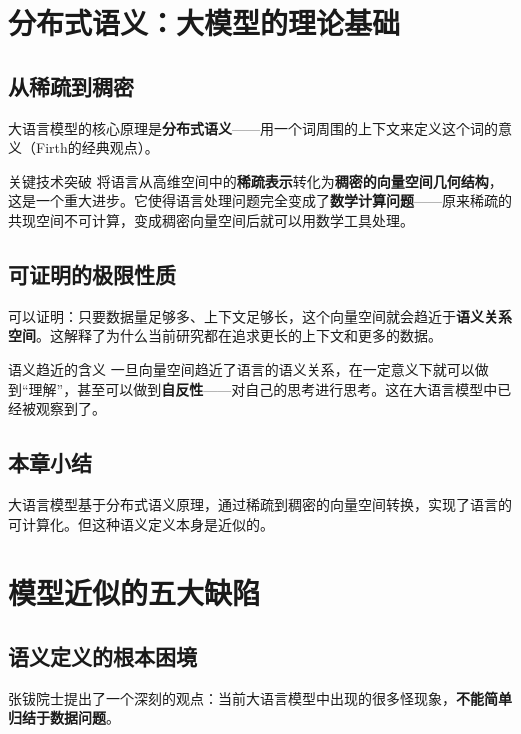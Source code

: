 \documentclass[a4paper]{article}
\begin{document}
\section{分布式语义：大模型的理论基础}

\subsection{从稀疏到稠密}

大语言模型的核心原理是\textbf{分布式语义}——用一个词周围的上下文来定义这个词的意义（Firth的经典观点）。

\begin{knowledgebox}{关键技术突破}
将语言从高维空间中的\textbf{稀疏表示}转化为\textbf{稠密的向量空间几何结构}，这是一个重大进步。它使得语言处理问题完全变成了\textbf{数学计算问题}——原来稀疏的共现空间不可计算，变成稠密向量空间后就可以用数学工具处理。
\end{knowledgebox}

\subsection{可证明的极限性质}

可以证明：只要数据量足够多、上下文足够长，这个向量空间就会趋近于\textbf{语义关系空间}。这解释了为什么当前研究都在追求更长的上下文和更多的数据。

\begin{importantbox}{语义趋近的含义}
一旦向量空间趋近了语言的语义关系，在一定意义下就可以做到``理解''，甚至可以做到\textbf{自反性}——对自己的思考进行思考。这在大语言模型中已经被观察到了。
\end{importantbox}

\subsection{本章小结}

大语言模型基于分布式语义原理，通过稀疏到稠密的向量空间转换，实现了语言的可计算化。但这种语义定义本身是近似的。


\section{模型近似的五大缺陷}

\subsection{语义定义的根本困境}

张钹院士提出了一个深刻的观点：当前大语言模型中出现的很多怪现象，\textbf{不能简单归结于数据问题}。
\end{document}
